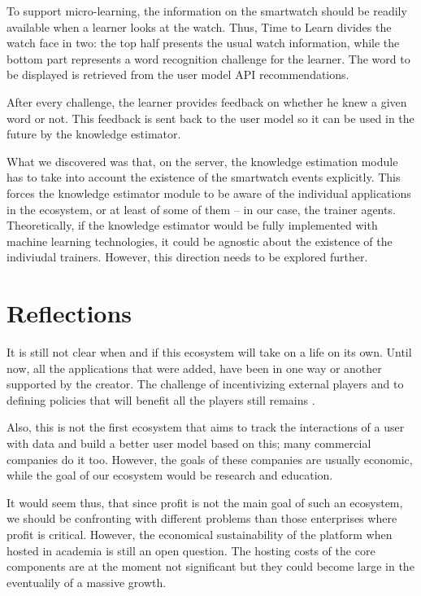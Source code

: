 \documentclass{sig-alternate-05-2015}
\begin{document}
To support micro-learning, the information on the smartwatch should be readily available when a learner looks at the watch. Thus, Time to Learn divides the watch face in two: the top half presents the usual watch information, while the bottom part represents a word recognition challenge for the learner. The word to be displayed is retrieved from the user model API recommendations. 

After every challenge, the learner provides feedback on whether he knew a given word or not. This feedback is sent back to the user model so it can be used in the future by the knowledge estimator. 

What we discovered was that, on the server, the knowledge estimation module has to take into account the existence of the smartwatch events explicitly. This forces the knowledge estimator module to be aware of the individual applications in the ecosystem, or at least of some of them -- in our case, the trainer agents. Theoretically, if the knowledge estimator would be fully implemented with machine learning technologies, it could be agnostic about the existence of the indiviudal trainers. However, this direction needs to be explored further.





\section {Reflections}

It is still not clear when and if this ecosystem will 
take on a life on its own. Until now, all the 
applications that were added, have been in one way
or another supported by the creator. The challenge
of incentivizing external players and
to defining policies that will benefit all the 
players still remains \cite{Jans09agenda}.


Also, this is not the first ecosystem that aims to track 
the interactions of a user with data and build a better 
user model based on this; many commercial companies do it too. 
However, the goals of these companies are usually economic, 
while the goal of our ecosystem would be research and education.

It would seem thus, that since profit is not the main
goal of such an ecosystem, we should be confronting
with different problems than those enterprises where 
profit is critical. However, the economical 
sustainability of the platform when hosted in academia
is still an open question. The hosting costs of the 
core components are at the moment not significant 
but they could become large in the eventualily of 
a massive growth.
\end{document}
